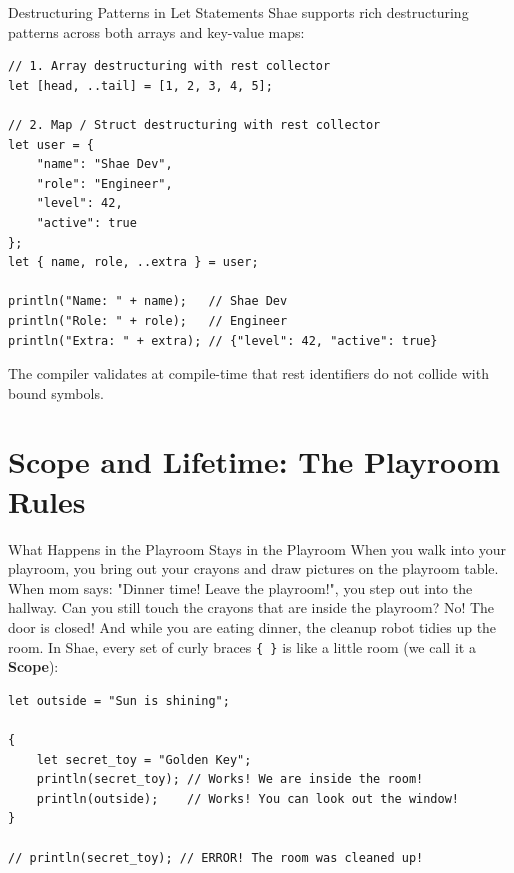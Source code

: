 \begin{syntaxbox}{Destructuring Patterns in Let Statements}
Shae supports rich destructuring patterns across both arrays and key-value maps:
\begin{lstlisting}[language=shaelang]
// 1. Array destructuring with rest collector
let [head, ..tail] = [1, 2, 3, 4, 5];

// 2. Map / Struct destructuring with rest collector
let user = {
    "name": "Shae Dev",
    "role": "Engineer",
    "level": 42,
    "active": true
};
let { name, role, ..extra } = user;

println("Name: " + name);   // Shae Dev
println("Role: " + role);   // Engineer
println("Extra: " + extra); // {"level": 42, "active": true}
\end{lstlisting}
The compiler validates at compile-time that rest identifiers do not collide with bound symbols.
\end{syntaxbox}

\section{Scope and Lifetime: The Playroom Rules}

\begin{kidbox}{What Happens in the Playroom Stays in the Playroom}
When you walk into your playroom, you bring out your crayons and draw pictures on the playroom table.
When mom says: "Dinner time! Leave the playroom!", you step out into the hallway.
Can you still touch the crayons that are inside the playroom? No! The door is closed!
And while you are eating dinner, the cleanup robot tidies up the room.
In Shae, every set of curly braces \texttt{\{ \}} is like a little room (we call it a \textbf{Scope}):
\begin{lstlisting}[language=shaelang]
let outside = "Sun is shining";

{
    let secret_toy = "Golden Key";
    println(secret_toy); // Works! We are inside the room!
    println(outside);    // Works! You can look out the window!
}

// println(secret_toy); // ERROR! The room was cleaned up!
\end{lstlisting}
\end{kidbox}

